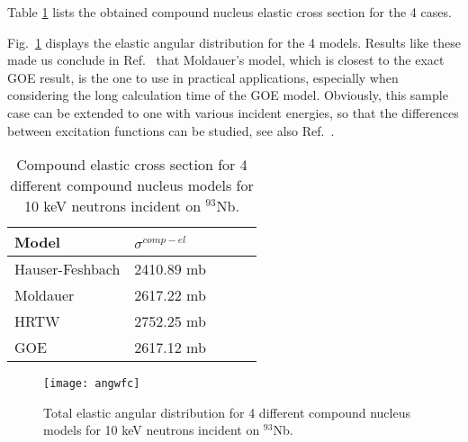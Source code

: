 \begin{samplecase}
Table \ref{wfctable} lists the obtained compound nucleus elastic cross section
for the 4 cases.

Fig.~\ref{angwfc} displays the elastic angular distribution for the 4 models.
Results like these made us conclude in Ref.~\cite{Hilaire2003} that Moldauer's model,
which is closest to the exact GOE result, is the one to use in practical
applications, especially when considering the long calculation time of the GOE model.
Obviously, this sample case can be extended to one with various
incident energies, so that the differences between excitation functions can be
studied, see also Ref.~\cite{Hilaire2003}.

\end{samplecase}
\begin{table}
\begin{center}
\begin{tabular}{l l l l l}
\hline
Model         & $\sigma ^{comp-el}$\\
\hline
Hauser-Feshbach & 2410.89 mb \\
Moldauer        & 2617.22 mb \\
HRTW            & 2752.25 mb \\
GOE             & 2617.12 mb \\
\hline
\end{tabular}
\end{center}
\caption{Compound elastic cross section for 4 different compound nucleus
models for 10 keV neutrons incident on ${}^{93}$Nb.}
\label{wfctable}
\end{table}
\begin{figure}
\centering\texttt{[image: angwfc]}
\caption{Total elastic angular distribution for 4 different compound nucleus
models for 10 keV neutrons incident on ${}^{93}$Nb.}
\label{angwfc}
\end{figure}
